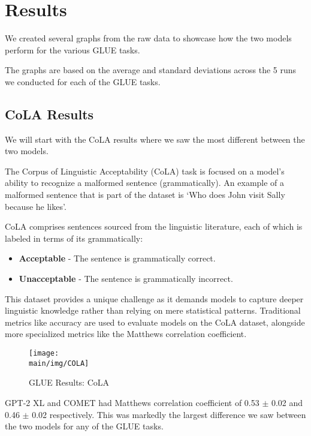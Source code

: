\documentclass[\main/thesis.tex]{subfiles}
\begin{document}
\chapter{Results}

We created several graphs from the raw data to showcase how the two models perform for the various GLUE tasks. 

The graphs are based on the average and standard deviations across the 5 runs we 
conducted for each of the GLUE tasks. 

\section{CoLA Results}\label{sec:cola_results}

We will start with the CoLA results where we saw the most different between the two models. 

The Corpus of Linguistic Acceptability (CoLA) task is focused on a model's ability 
to recognize a malformed sentence (grammatically). An example of a malformed sentence that is 
part of the dataset is `Who does John visit Sally because he likes'.

CoLA comprises sentences sourced from the linguistic literature, each of which is labeled in terms of its grammatically:
\begin{itemize}
    \item \textbf{Acceptable} - The sentence is grammatically correct.
    \item \textbf{Unacceptable} - The sentence is grammatically incorrect.
\end{itemize}

This dataset provides a unique challenge as it demands models to capture deeper linguistic knowledge rather than relying on mere statistical patterns. 
Traditional metrics like accuracy are used to evaluate models on the CoLA dataset, alongside more specialized metrics like the Matthews correlation coefficient.

\begin{figure}
    \texttt{[image: \\main/img/COLA]}
    \caption[GLUE Results: CoLA] {GLUE Results: CoLA}
    \label{fig:cola_fig}
\end{figure}

GPT-2 XL and COMET had  Matthews correlation coefficient of 0.53 $\pm$ 0.02 and 0.46 $\pm$ 0.02 respectively. This was markedly the largest
difference we saw between the two models for any of the GLUE tasks. 
\end{document}
